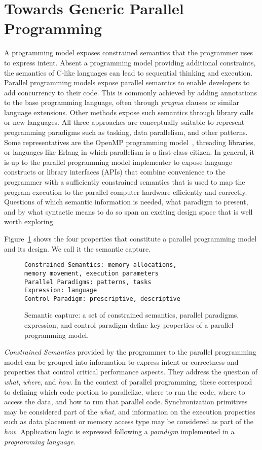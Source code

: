 \section{Towards Generic Parallel Programming}\label{chap:background}

A programming model exposes constrained semantics that the programmer uses to express intent. Absent a programming model providing additional constraints, the semantics of C-like languages can lead to sequential thinking and execution. Parallel programming models expose parallel semantics to enable developers to add concurrency to their code. This is commonly achieved by adding annotations to the base programming language, often through \emph{pragma} clauses or similar language extensions. Other methods expose such semantics through library calls or new languages. All three approaches are conceptually suitable to represent programming paradigms such as tasking, data parallelism, and other patterns. Some representatives are the OpenMP programming model~\cite{OPENMP}, threading libraries, or languages like Erlang\cite{ERLANG} in which parallelism is a first-class citizen. In general, it is up to the parallel programming model implementer to expose language constructs or library interfaces (APIs) that combine convenience to the programmer with a sufficiently constrained semantics that is used to map the program execution to the parallel computer hardware efficiently and correctly. Questions of which semantic information is needed, what paradigm to present, and by what syntactic means to do so span an exciting design space that is well worth exploring.

 Figure~\ref{figSemCapture} shows the four properties that constitute a parallel programming model and its design. We call it the semantic capture.

\begin{figure}[t!]
\begin{verbatim}
Constrained Semantics: memory allocations, 
memory movement, execution parameters
Parallel Paradigms: patterns, tasks
Expression: language 
Control Paradigm: prescriptive, descriptive
\end{verbatim}
\caption{Semantic capture: a set of constrained semantics, parallel paradigms, expression, and control paradigm define key properties of a parallel programming model.}
\label{figSemCapture}
\end{figure}

\emph{Constrained Semantics} provided by the programmer to the parallel programming model can be grouped into information to express intent or correctness and properties that control critical performance aspects. They address the question of \emph{what}, \emph{where}, and \emph{how}. In the context of parallel programming, these correspond to defining which code portion to parallelize, where to run the code, where to access the data, and how to run that parallel code. Synchronization primitives may be considered part of the \emph{what}, and information on the execution properties such as data placement or memory access type may be considered as part of the \emph{how}. Application logic is expressed following a \emph{paradigm} implemented in a \emph{programming language}.

